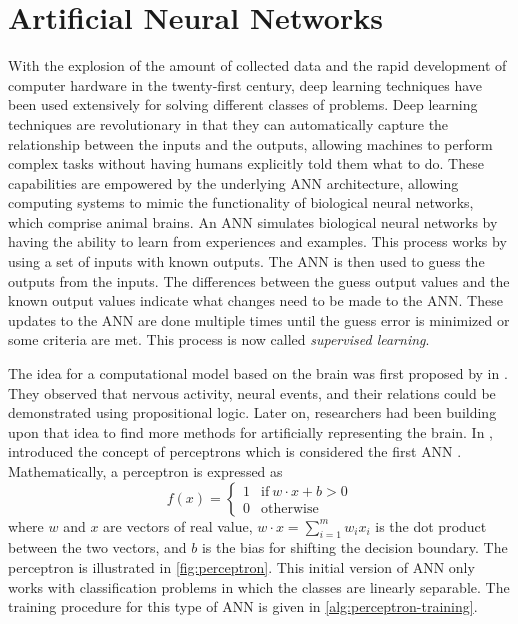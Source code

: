 \section{Artificial Neural Networks}

With the explosion of the amount of collected data and the rapid development of computer hardware in the twenty-first century, deep learning techniques have been used extensively for solving different classes of problems.
Deep learning techniques are revolutionary in that they can automatically capture the relationship between the inputs and the outputs, allowing machines to perform complex tasks without having humans explicitly told them what to do.
These capabilities are empowered by the underlying \gls{ANN} architecture, allowing computing systems to mimic the functionality of biological neural networks, which comprise animal brains.
An \gls{ANN} simulates biological neural networks by having the ability to learn from experiences and examples.
This process works by using a set of inputs with known outputs.
The \gls{ANN} is then used to guess the outputs from the inputs.
The differences between the guess output values and the known output values indicate what changes need to be made to the \gls{ANN}.
These updates to the \gls{ANN} are done multiple times until the guess error is minimized or some criteria are met.
This process is now called \textit{supervised learning}.

The idea for a computational model based on the brain was first proposed by \citeauthor{mcculloch1943logical} in \citeyear{mcculloch1943logical} \cite{mcculloch1943logical}.
They observed that nervous activity, neural events, and their relations could be demonstrated using propositional logic.
Later on, researchers had been building upon that idea to find more methods for artificially representing the brain.
In \citeyear{rosenblattPerceptronProbabilisticModel1958}, \citeauthor{rosenblattPerceptronProbabilisticModel1958} introduced the concept of perceptrons which is considered the first \gls{ANN} \cite{rosenblattPerceptronProbabilisticModel1958}.
Mathematically, a perceptron is expressed as
\begin{equation}
    f(x) = \begin{cases}
        1 & \textrm{if}\ w \cdot x + b > 0 \\
        0 & \textrm{otherwise}
    \end{cases}
    \label{eq:perceptron}
\end{equation}
where $w$ and $x$ are vectors of real value, $w \cdot x = \sum_{i=1}^m{w_i x_i}$ is the dot product between the two vectors, and $b$ is the bias for shifting the decision boundary.
The perceptron is illustrated in \autoref{fig:perceptron}.
This initial version of \gls{ANN} only works with classification problems in which the classes are linearly separable.
The training procedure for this type of \gls{ANN} is given in \autoref{alg:perceptron-training}.

